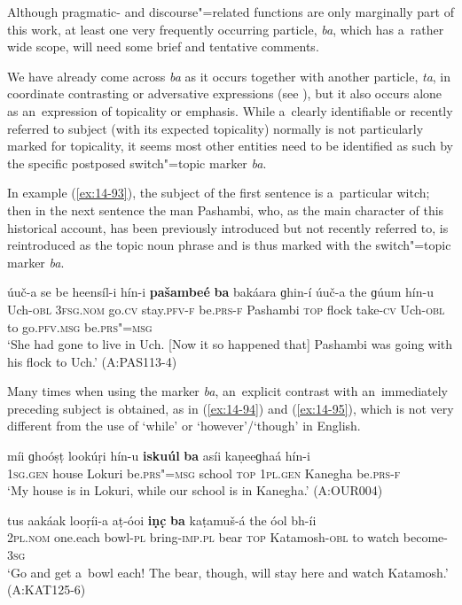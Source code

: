 Although pragmatic- and discourse"=related functions are only marginally part of this work, at least one very frequently occurring particle, \textit{ba}, which has a~rather wide scope, will need some brief and tentative comments.



We have already come across \textit{ba} as it occurs together with another particle, \textit{ta}, in coordinate contrasting or adversative expressions (see ), but it also occurs alone as an~expression of topicality or emphasis. While a~clearly identifiable or recently referred to subject (with its expected topicality) normally is not particularly marked for topicality, it seems most other entities need to be identified as such by the specific postposed switch"=topic \citep[149]{andrews2007} marker \textit{ba}.



In example (\ref{ex:14-93}), the subject of the first sentence is a~particular witch; then in the next sentence the man Pashambi, who, as the main character of this historical account, has been previously introduced but not recently referred to, is reintroduced as the topic noun phrase and is thus marked with the switch"=topic marker \textit{ba}.

\begin{exe}
\ex
\label{ex:14-93}
\gll úuč-a se  be heensíl-i  hín-i \textbf{pašambeé} \textbf{ba} bakáara ɡhin-í úuč-a the ɡúum hín-u \\
Uch-\textsc{obl} \textsc{3fsg.nom} go.\textsc{cv} stay.\textsc{pfv-f} be.\textsc{prs-f} Pashambi  \textsc{top} flock take-\textsc{cv} Uch-\textsc{obl} to go.\textsc{pfv.msg} be.\textsc{prs"=msg} \\
\glt `She had gone to live in Uch. [Now it so happened that] Pashambi was going with his flock to Uch.' (A:PAS113-4)
\end{exe}

Many times when using the marker \textit{ba}, an~explicit contrast with an~immediately preceding subject is obtained, as in (\ref{ex:14-94}) and (\ref{ex:14-95}), which is not very different from the use of `while' or `however'/`though' in English.

\begin{exe}
\ex
\label{ex:14-94}
\gll míi ɡhoóṣṭ lookúṛi hín-u \textbf{iskuúl} \textbf{ba} asíi kaṇeeɡhaá hín-i\\
\textsc{1sg.gen} house Lokuri be.\textsc{prs"=msg} school \textsc{top} \textsc{1pl.gen} Kanegha be.\textsc{prs-f}\\
\glt `My house is in Lokuri, while our school is in Kanegha.' (A:OUR004)

\ex
\label{ex:14-95}
\gll tus aakáak looṛíi-a aṭ-óoi \textbf{iṇc̣} \textbf{ba}  kaṭamuš-á the óol bh-íi \\
\textsc{2pl.nom} one.each bowl-\textsc{pl} bring-\textsc{imp.pl} bear \textsc{top} Katamosh-\textsc{obl} to watch become-\textsc{3sg } \\
\glt `Go and get a~bowl each! The bear, though, will stay here and watch Katamosh.' (A:KAT125-6)
\end{exe}

